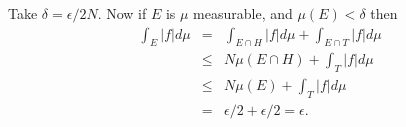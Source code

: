\begin{enumerate}
Take \(\delta = \epsilon/2N\).
Now if $E$ is \(\mu\) measurable, and \(\mu(E)<\delta\) then
\begin{eqnarray*}
\int_E |f|d\mu
&=& \int_{E\cap H} |f|d\mu + \int_{E\cap T} |f|d\mu \\
&\leq& N\mu(E\cap H) + \int_{T} |f|d\mu \\
&\leq& N\mu(E) + \int_T |f|d\mu \\
&=& \epsilon/2  + \epsilon/2 = \epsilon.
\end{eqnarray*}


\end{enumerate}
